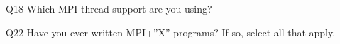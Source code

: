 \begin{description}%
\item{Q18} Which MPI thread support are you using?%
\item{Q22} Have you ever written MPI+”X” programs? If so, select all that apply.%
\end{description}%
